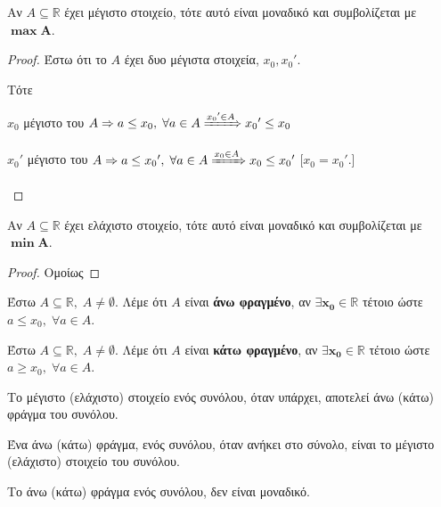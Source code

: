 \begin{mybox3}
\begin{prop}
  Αν $ A \subseteq \mathbb{R} $ έχει μέγιστο στοιχείο, τότε αυτό είναι 
  μοναδικό και συμβολίζεται με $ \bm{\max A} $.
\end{prop}
\end{mybox3}
\begin{proof}
  Έστω ότι το $A$ έχει δυο μέγιστα στοιχεία,  $ x_{0}, {x_{0}}' $.

  Τότε 
  \begin{myitemize}
    \item $ x_{0} $ μέγιστο του $A \Rightarrow a \leq x_{0}, \; \forall a \in A \xRightarrow{{x_{0}}' 
      \in A } {x_{0}}'  \leq x_{0} $ 
    \item $ x_{0}' $ μέγιστο του $ A \Rightarrow a \leq {x_{0}}', \; \forall a \in A \xRightarrow{x_{0} 
      \in A } x_{0} \leq {x_{0}}' $ 
      [$ x_{0} = {x_{0}}' $.] 
  \end{myitemize}
\end{proof}

\begin{mybox3}
\begin{prop}
  Αν $ A \subseteq \mathbb{R} $ έχει ελάχιστο στοιχείο, τότε αυτό είναι 
  μοναδικό και συμβολίζεται με $ \bm{\min A} $.
\end{prop}
\end{mybox3}

\begin{proof}
  Ομοίως 
\end{proof}

\begin{mybox1}
\begin{dfn}
  Έστω $ A \subseteq \mathbb{R}, \; A \neq \emptyset $. Λέμε ότι 
  $A$ είναι \textbf{άνω φραγμένο}, αν $ \bm{\exists x_{0} \in \mathbb{R}}$ τέτοιο ώστε 
  $ a \leq x_{0}, \; \forall a \in A$.
\end{dfn}
\end{mybox1}

\begin{mybox1}
\begin{dfn}
  Έστω $ A \subseteq \mathbb{R}, \; A \neq \emptyset $. Λέμε ότι 
  $A$ είναι \textbf{κάτω φραγμένο}, αν $ \bm{\exists x_{0} \in \mathbb{R}}$ τέτοιο ώστε 
  $ a \geq x_{0}, \; \forall a \in A $.
\end{dfn}
\end{mybox1}

\begin{rems}
\item {}
  \begin{myitemize}
    \item Το μέγιστο (ελάχιστο) στοιχείο ενός συνόλου, όταν υπάρχει, αποτελεί άνω
      (κάτω) φράγμα του συνόλου.
    \item Ένα  άνω (κάτω) φράγμα, ενός συνόλου, όταν ανήκει στο σύνολο, είναι 
      το μέγιστο (ελάχιστο) στοιχείο του συνόλου.
    \item Το άνω (κάτω) φράγμα ενός συνόλου, δεν είναι μοναδικό.
  \end{myitemize}
\end{rems}

